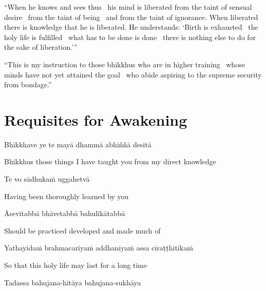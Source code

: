 “When he knows and sees thus \breathmark\ his mind is liberated from the taint of sensual desire \breathmark\ from the taint of being \breathmark\ and from the taint of ignorance. When liberated there is knowledge that he is liberated. He understands: ‘Birth is exhausted \breathmark\ the holy life is fulfilled \breathmark\ what has to be done is done \breathmark\ there is nothing else to do for the sake of liberation.’”

\suttaRef{[MN 39]}

“This is my instruction to those bhikkhus who are in higher training \breathmark\ whose minds have not yet attained the goal \breathmark\ who abide aspiring to the supreme security from bondage.”

\suttaRef{[MN 107]}

\clearpage

\section{Requisites for Awakening}
\label{requisites-for-awakening}

\begin{leader}
\end{leader}

Bhikkhave ye te mayā dhammā abhiññā desitā

\begin{cprenglish}
  Bhikkhus those things I have taught you from my direct knowledge
\end{cprenglish}

Te vo sādhukaṁ uggahetvā

\begin{cprenglish}
  Having been thoroughly learned by you
\end{cprenglish}

Āsevitabbā bhāvetabbā bahulīkātabbā

\begin{cprenglish}
  Should be practiced developed and made much of
\end{cprenglish}

Yathayidaṁ brahmacariyaṁ addhaniyaṁ assa ciraṭṭhitikaṁ

\begin{cprenglish}
  So that this holy life may last for a long time
\end{cprenglish}

Tadassa bahujana-hitāya bahujana-sukhāya

